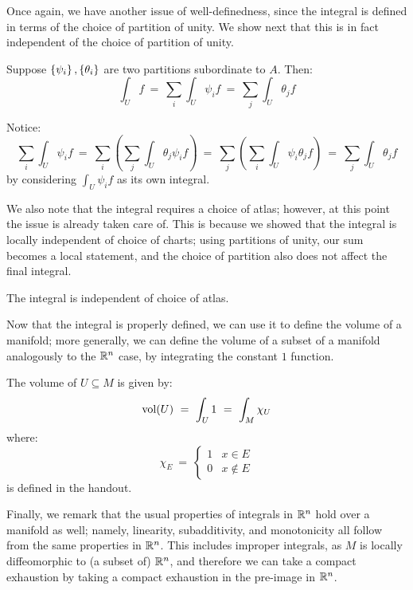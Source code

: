 Once again, we have another issue of well-definedness, since the integral is
defined in terms of the choice of partition of unity. We show next that this is
in fact independent of the choice of partition of unity.

\begin{thm}
    Suppose $ \left\{{\psi_{i}}\right\}, \left\{{\theta_{i}}\right\} $ are two partitions subordinate
    to $ A $. Then:
    \begin{equation*}
        \int_{U}f \ = \ \sum_{i}\int_{U}\psi_{i}f
        \ = \ \sum_{j}\int_{U}\theta_{j}f
    \end{equation*}
\end{thm}
\vspace{-0.2in}
\begin{pf}
    Notice:
    \begin{equation*}
        \sum_{i}\int_{U}\psi_{i}f \ = \
        \sum_{i}\left( \sum_{j}\int_{U}\theta_{j}\psi_{i}f \right) \ = \
        \sum_{j}\left( \sum_{i}\int_{U}\psi_{i}\theta_{j}f \right) \ = \
        \sum_{j}\int_{U}\theta_{j}f
    \end{equation*}
    by considering $ \int_{U}\psi_{i}f $ as its own integral.
\end{pf}

We also note that the integral requires a choice of atlas; however, at this point
the issue is already taken care of. This is because we showed that the integral
is locally independent of choice of charts; using partitions of unity, our sum
becomes a local statement, and the choice of partition also does not affect the
final integral.

\begin{crll}
    The integral is independent of choice of atlas.
\end{crll}

Now that the integral is properly defined, we can use it to define the volume of
a manifold; more generally, we can define the volume of a subset of a manifold
analogously to the $ \mathbb{R}^{n} $ case, by integrating the constant $ 1 $ function.

\begin{crll}
    The volume of $ U \subseteq M $ is given by:
    \begin{equation*}
        \vol(U) \ = \ \int_{U}1 \ = \ \int_{M}\chi_{U}
    \end{equation*}
    where:
    \begin{equation*}
        \chi_{E} \ = \
        \begin{cases}
            1 & x \in E \\
            0 & x \notin E
        \end{cases}
    \end{equation*}
    is defined in the handout.
\end{crll}

Finally, we remark that the usual properties of integrals in $ \mathbb{R}^{n} $ hold
over a manifold as well; namely, linearity, subadditivity, and monotonicity all
follow from the same properties in $ \mathbb{R}^{n} $. This includes improper integrals,
as $ M $ is locally diffeomorphic to (a subset of) $ \mathbb{R}^{n} $, and therefore we
can take a compact exhaustion by taking a compact exhaustion in the pre-image in
$ \mathbb{R}^{n} $.

